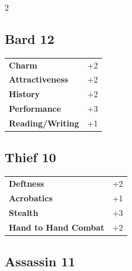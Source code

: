 \begin{multicols}{2}
\begin{tcolorbox}
    \subsection*{Bard \hfill \small{12 }}
    \tcblower




\begin{tabular}{@{}ll@{}}
    \textbf{Charm} & +2\\
    \textbf{Attractiveness} & +2\\
    \textbf{History} & +2\\
    \textbf{Performance} & +3\\
    \textbf{Reading/Writing} & +1\\
\end{tabular}


\end{tcolorbox}

\begin{tcolorbox}
    \subsection*{Thief \hfill \small{10 }}
    \tcblower




\begin{tabular}{@{}ll@{}}
    \textbf{Deftness} & +2\\
    \textbf{Acrobatics} & +1\\
    \textbf{Stealth} & +3\\
    \textbf{Hand to Hand Combat} & +2\\
\end{tabular}


\end{tcolorbox}

\begin{tcolorbox}
    \subsection*{Assassin \hfill \small{11 }}
    \tcblower





\end{tcolorbox}
\end{multicols}
